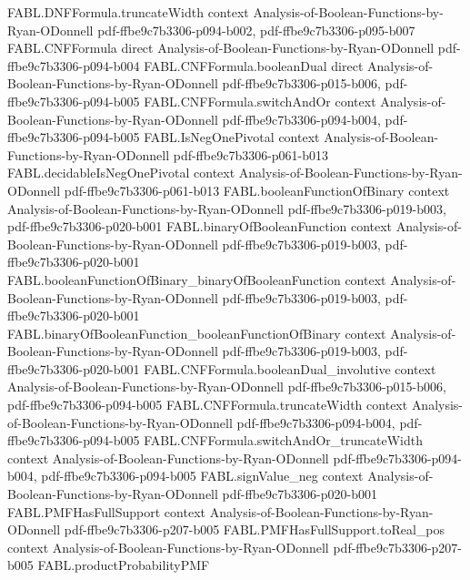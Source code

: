 \begin{theorem}
\proofstep
  {FABL.DNFFormula.truncateWidth}
  {context}
  {Analysis-of-Boolean-Functions-by-Ryan-ODonnell}
  {pdf-ffbe9c7b3306-p094-b002,
    pdf-ffbe9c7b3306-p095-b007}
\proofstep
  {FABL.CNFFormula}
  {direct}
  {Analysis-of-Boolean-Functions-by-Ryan-ODonnell}
  {pdf-ffbe9c7b3306-p094-b004}
\proofstep
  {FABL.CNFFormula.booleanDual}
  {direct}
  {Analysis-of-Boolean-Functions-by-Ryan-ODonnell}
  {pdf-ffbe9c7b3306-p015-b006,
    pdf-ffbe9c7b3306-p094-b005}
\proofstep
  {FABL.CNFFormula.switchAndOr}
  {context}
  {Analysis-of-Boolean-Functions-by-Ryan-ODonnell}
  {pdf-ffbe9c7b3306-p094-b004,
    pdf-ffbe9c7b3306-p094-b005}
\proofstep
  {FABL.IsNegOnePivotal}
  {context}
  {Analysis-of-Boolean-Functions-by-Ryan-ODonnell}
  {pdf-ffbe9c7b3306-p061-b013}
\proofstep
  {FABL.decidableIsNegOnePivotal}
  {context}
  {Analysis-of-Boolean-Functions-by-Ryan-ODonnell}
  {pdf-ffbe9c7b3306-p061-b013}
\proofstep
  {FABL.booleanFunctionOfBinary}
  {context}
  {Analysis-of-Boolean-Functions-by-Ryan-ODonnell}
  {pdf-ffbe9c7b3306-p019-b003,
    pdf-ffbe9c7b3306-p020-b001}
\proofstep
  {FABL.binaryOfBooleanFunction}
  {context}
  {Analysis-of-Boolean-Functions-by-Ryan-ODonnell}
  {pdf-ffbe9c7b3306-p019-b003,
    pdf-ffbe9c7b3306-p020-b001}
\proofstep
  {FABL.booleanFunctionOfBinary_binaryOfBooleanFunction}
  {context}
  {Analysis-of-Boolean-Functions-by-Ryan-ODonnell}
  {pdf-ffbe9c7b3306-p019-b003,
    pdf-ffbe9c7b3306-p020-b001}
\proofstep
  {FABL.binaryOfBooleanFunction_booleanFunctionOfBinary}
  {context}
  {Analysis-of-Boolean-Functions-by-Ryan-ODonnell}
  {pdf-ffbe9c7b3306-p019-b003,
    pdf-ffbe9c7b3306-p020-b001}
\proofstep
  {FABL.CNFFormula.booleanDual_involutive}
  {context}
  {Analysis-of-Boolean-Functions-by-Ryan-ODonnell}
  {pdf-ffbe9c7b3306-p015-b006,
    pdf-ffbe9c7b3306-p094-b005}
\proofstep
  {FABL.CNFFormula.truncateWidth}
  {context}
  {Analysis-of-Boolean-Functions-by-Ryan-ODonnell}
  {pdf-ffbe9c7b3306-p094-b004,
    pdf-ffbe9c7b3306-p094-b005}
\proofstep
  {FABL.CNFFormula.switchAndOr_truncateWidth}
  {context}
  {Analysis-of-Boolean-Functions-by-Ryan-ODonnell}
  {pdf-ffbe9c7b3306-p094-b004,
    pdf-ffbe9c7b3306-p094-b005}
\proofstep
  {FABL.signValue_neg}
  {context}
  {Analysis-of-Boolean-Functions-by-Ryan-ODonnell}
  {pdf-ffbe9c7b3306-p020-b001}
\proofstep
  {FABL.PMFHasFullSupport}
  {context}
  {Analysis-of-Boolean-Functions-by-Ryan-ODonnell}
  {pdf-ffbe9c7b3306-p207-b005}
\proofstep
  {FABL.PMFHasFullSupport.toReal_pos}
  {context}
  {Analysis-of-Boolean-Functions-by-Ryan-ODonnell}
  {pdf-ffbe9c7b3306-p207-b005}
\proofstep
  {FABL.productProbabilityPMF}

\end{theorem}

